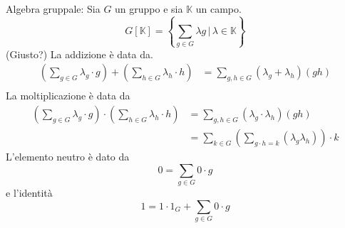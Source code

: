 \documentclass[a4paper]{article}
\begin{document}
Algebra gruppale: Sia \(G\) un gruppo e sia \(\mathbb{K}\) un campo.
\[
    G[\mathbb{K}] = \left\{
        \sum_{g\in G} \lambda g \,|\, \lambda \in \mathbb{K}
    \right\}
\]
(Giusto?)
La addizione è data da.
\begin{align*}
    \left( \sum_{g\in G} \lambda_g \cdot g \right)
    + \left( \sum_{h\in G} \lambda_h \cdot h \right)
    &= \sum_{g,h \in G} (\lambda_g + \lambda_h) (gh) \\
\end{align*}
La moltiplicazione è data da
\begin{align*}
    \left( \sum_{g\in G} \lambda_g \cdot g \right)
    \cdot \left( \sum_{h\in G} \lambda_h \cdot h \right)
    &= \sum_{g,h \in G} (\lambda_g \cdot \lambda_h) (gh) \\
    &= \sum_{k\in G} \left(\sum_{g\cdot h = k} (\lambda_g \lambda_h) \right) \cdot k
\end{align*}
L'elemento neutro è dato da
\[
    0 = \sum_{g\in G} 0 \cdot g
\]
e l'identità
\[
    1 = 1 \cdot 1_G + \sum_{g\in G} 0 \cdot g
\]

\end{document}
